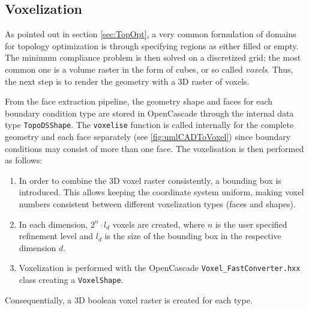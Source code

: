 \subsection{Voxelization}
\label{sec: Voxelization}

As pointed out in section \ref{sec:TopOpt}, a very common formulation of domains for topology optimization is through specifying regions as either filled or empty. The minimum compliance problem is then solved on a discretized grid; the most common one is a volume raster in the form of cubes, or so called \emph{voxels}. Thus, the next step is to render the geometry with a 3D raster of voxels.

From the face extraction pipeline, the geometry shape and faces for each boundary condition type are stored in OpenCascade through the internal data type \lstinline|TopoDSShape|. The \lstinline|voxelise| function is called internally for the complete geometry and each face separately (see \autoref{fig:umlCADToVoxel}) since boundary conditions may consist of more than one face. The voxelisation is then performed as follows: 
\begin{enumerate}
\item In order to combine the 3D voxel raster consistently, a bounding box is introduced. This allows keeping the coordinate system uniform, making voxel numbers consistent between different voxelization types (faces and shapes). 
\item In each dimension, $2^n \cdot l_d$ voxels are created, where $n$ is the user specified refinement level and $l_d$ is the size of the bounding box in the respective dimension $d$.
\item Voxelization is performed with the OpenCascade  \lstinline|Voxel_FastConverter.hxx| class creating a \lstinline|VoxelShape|.
\end{enumerate}

Consequentially, a 3D boolean voxel raster is created for each type.
